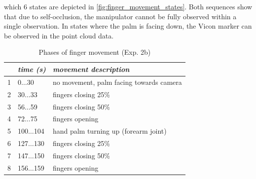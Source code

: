 which 6 states are depicted in \cref{fig:finger_movement_states}. Both sequences show that due to self-occlusion, the manipulator cannot be fully observed within a single observation. In states where the palm is facing down, the Vicon marker can be observed in the point cloud data.

\begin{table}[h]
\centering
\begin{tabular}{|c|l|l|}
\hline
 & \emph{time (s)} & \emph{movement description} \\
\hline
1 & 0$\dots$30 & no movement, palm facing towards camera \\
\hline
2 & 30$\dots$33 & fingers closing 25\% \\
\hline
3 & 56$\dots$59 & fingers closing 50\% \\
\hline
4 & 72$\dots$75 & fingers opening \\
\hline
5 & 100$\dots$104 & hand palm turning up (forearm joint) \\
\hline
6 & 127$\dots$130 & fingers closing 25\% \\
\hline
7 & 147$\dots$150 & fingers closing 50\% \\
\hline
8 & 156$\dots$159 & fingers opening \\
\hline
\end{tabular}
\caption{Phases of finger movement (Exp. 2b)}
\label{tab:vic_finger_movement_phases}
\end{table}

\setlength{\imgwidth}{0.26\textwidth}

